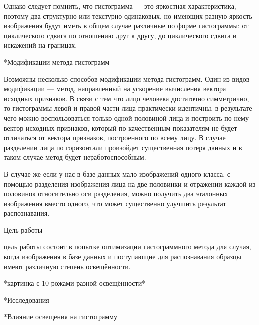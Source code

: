 \documentclass[a4paper,12pt,titlpage]{posobie}
\makeatletter
\renewcommand{\section}{\@startsection{section}{1}{0.0cm}{0.5cm}{0.1cm}%
             {\fontsize{16}{16}\bf\selectfont }}
\renewcommand{\subsection}{\@startsection{subsection}{2}{0.0cm}{0.3cm}{0.1cm}%
             {\fontsize{14}{16}\bf\selectfont }}
\makeatother
\begin{document}
     Однако следует помнить, что гистограмма --- это яркостная характеристика, поэтому два структурно или текстурно одинаковых, но имеющих
разную яркость изображения будут иметь в общем случае различные по форме гистограммы: от циклического сдвига по отношению друг к другу, до циклического сдвига и искажений на границах.

\subsection*{Модификации метода гистограмм}


    Возможны несколько способов модификации метода гистограмм. Один из видов модификации --- метод, направленный на ускорение вычисления
вектора исходных признаков. В связи с тем что лицо человека достаточно симметрично, то гистограммы левой и правой части лица практически 
идентичны, в результате чего можно воспользоваться только одной половиной лица и построить по нему вектор исходных признаков, который
по качественным показателям не будет отличаться от вектора признаков, построенного по всему лицу. В случае разделении лица по горизонтали 
произойдет существенная потеря данных и в таком случае метод будет неработоспособным. 

    В случае же если у нас в базе данных мало изображений одного класса, с помощью разделения изображения лица 
на две половинки и отражении каждой из половинок относительно оси разделения, можно 
получить два эталонных изображения вместо одного, что может существенно улучшить результат распознавания. 

Цель работы

цель работы состоит в попытке оптимизации гистограммного метода для случая, когда изображения в базе данных и поступающие для распознавания образцы имеют различную степень освещённости.

*картинка с 10 рожами разной освещённости*

\section*{Исследования}


\subsection*{Влияние освещения на гистограмму}
\end{document}
